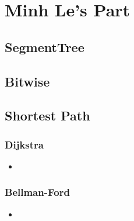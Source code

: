 \chapter{Minh Le's Part}

\section{SegmentTree}

\section{Bitwise}
	
\section{Shortest Path}
	\subsection{Dijkstra}
		\begin{itemize}
			\item {}
		\end{itemize}
	\subsection{Bellman-Ford}
		\begin{itemize}
			\item {}
		\end{itemize}